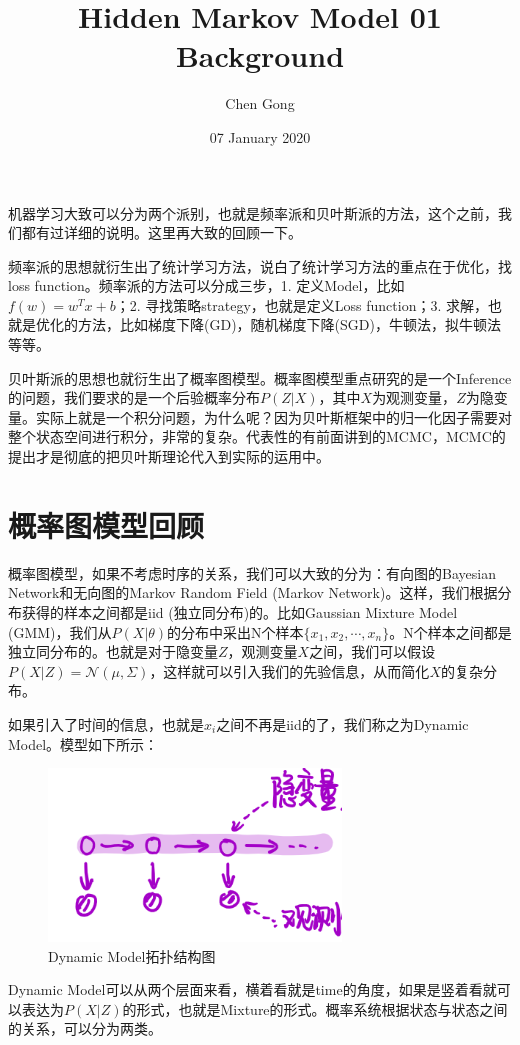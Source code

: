 \documentclass[a4paper]{article}
\title{Hidden Markov Model 01 Background}
\author{Chen Gong}
\date{07 January 2020}
\begin{document}
\maketitle
机器学习大致可以分为两个派别，也就是频率派和贝叶斯派的方法，这个之前，我们都有过详细的说明。这里再大致的回顾一下。

频率派的思想就衍生出了统计学习方法，说白了统计学习方法的重点在于优化，找loss function。频率派的方法可以分成三步，1. 定义Model，比如$f(w) = w^Tx+b$；2. 寻找策略strategy，也就是定义Loss function；3. 求解，也就是优化的方法，比如梯度下降(GD)，随机梯度下降(SGD)，牛顿法，拟牛顿法等等。

贝叶斯派的思想也就衍生出了概率图模型。概率图模型重点研究的是一个Inference的问题，我们要求的是一个后验概率分布$P(Z|X)$，其中$X$为观测变量，$Z$为隐变量。实际上就是一个积分问题，为什么呢？因为贝叶斯框架中的归一化因子需要对整个状态空间进行积分，非常的复杂。代表性的有前面讲到的MCMC，MCMC的提出才是彻底的把贝叶斯理论代入到实际的运用中。
\section{概率图模型回顾}
概率图模型，如果不考虑时序的关系，我们可以大致的分为：有向图的Bayesian Network和无向图的Markov Random Field (Markov Network)。这样，我们根据分布获得的样本之间都是iid (独立同分布)的。比如Gaussian Mixture Model (GMM)，我们从$P(X|\theta)$的分布中采出N个样本$\{ x_1,x_2,\cdots,x_n \}$。N个样本之间都是独立同分布的。也就是对于隐变量$Z$，观测变量$X$之间，我们可以假设$P(X|Z) = \mathcal{N}(\mu,\Sigma)$，这样就可以引入我们的先验信息，从而简化$X$的复杂分布。

如果引入了时间的信息，也就是$x_i$之间不再是iid的了，我们称之为Dynamic Model。模型如下所示：
\begin{figure}[H]
    \centering
    \includegraphics[width=.45\textwidth]{微信图片_20200107212223.png}
    \caption{Dynamic Model拓扑结构图}
    \label{fig:my_label_1}
\end{figure}

Dynamic Model可以从两个层面来看，横着看就是time的角度，如果是竖着看就可以表达为$P(X|Z)$的形式，也就是Mixture的形式。概率系统根据状态与状态之间的关系，可以分为两类。
\end{document}
